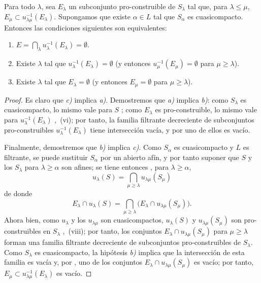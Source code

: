\begin{corollary}[8.3.3]
\label{IV.8.3.3-fr}
Para todo $\lambda$, sea $E_\lambda$ un subconjunto pro-construible de $S_\lambda$ tal que, para $\lambda\leq\mu$, $E_\mu\subset u_{\lambda\mu}^{-1}(E_\lambda)$.
Supongamos que existe $\alpha\in L$ tal que $S_\alpha$ es cuasicompacto.
Entonces las condiciones siguientes son equivalentes:
\begin{enumerate}[label=\emph{\alph*)}]
   \item $E=\bigcap_\lambda u_\lambda^{-1}(E_\lambda)=\emptyset$.
   \item Existe $\lambda$ tal que $u_\lambda^{-1}(E_\lambda)=\emptyset$ \textup{(y entonces $u_\mu^{-1}(E_\mu)=\emptyset$ para $\mu\geq\lambda$)}.
   \item Existe $\lambda$ tal que $E_\lambda=\emptyset$ \textup{(y entonces $E_\mu=\emptyset$ para $\mu\geq\lambda$)}.
\end{enumerate}
\end{corollary}

\begin{proof}
Es claro que \emph{c)} implica \emph{a)}.
Demostremos que \emph{a)} implica \emph{b)}: como $S_\lambda$ es cuasicompacto, lo mismo vale para $S$ ; como $E_\lambda$ es pro-construible, lo mismo vale para $u_\lambda^{-1}(E_\lambda)$ ,~(vi); por tanto, la familia filtrante decreciente de subconjuntos pro-construibles $u_\lambda^{-1}(E_\lambda)$ tiene intersección vacía, y por  uno de ellos es vacío.

Finalmente, demostremos que \emph{b)} implica \emph{c)}.
Como $S_\alpha$ es cuasicompacto y $L$ es filtrante, se puede sustituir $S_\alpha$ por un abierto afín, y por tanto suponer  que $S$ y los $S_\lambda$ para $\lambda\geq\alpha$ son afines; se tiene entonces , para $\lambda\geq\alpha$,
\[
u_\lambda(S)=\bigcap_{\mu\geq\lambda}u_{\lambda\mu}(S_\mu)
\]
de donde
\[
E_\lambda\cap u_\lambda(S)=
\bigcap_{\mu\geq\lambda}
\bigl(E_\lambda\cap u_{\lambda\mu}(S_\mu)\bigr).
\]
Ahora bien, como $u_\lambda$ y los $u_{\lambda\mu}$ son cuasicompactos, $u_\lambda(S)$ y $u_{\lambda\mu}(S_\mu)$ son pro-construibles en $S_\lambda$ ,~(viii); por tanto, los conjuntos $E_\lambda\cap u_{\lambda\mu}(S_\mu)$ para $\mu\geq\lambda$ forman una familia filtrante decreciente de subconjuntos pro-construibles de $S_\lambda$.
Como $S_\lambda$ es cuasicompacto, la hipótesis \emph{b)} implica que la intersección de esta familia es vacía y, por , uno de los conjuntos $E_\lambda\cap u_{\lambda\mu}(S_\mu)$ es vacío; por tanto, $E_\mu\subset u_{\lambda\mu}^{-1}(E_\lambda)$ es vacío.
\end{proof}

